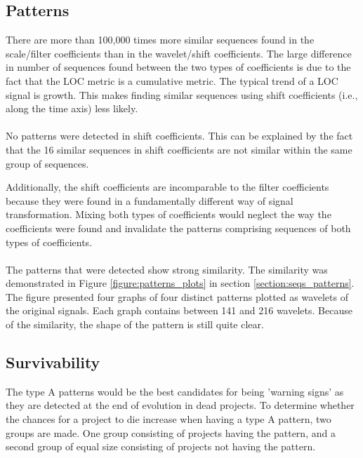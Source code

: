 \subsection{Patterns}
\label{section:pattern_evaluation}
There are more than 100,000 times more similar sequences found in the
scale/filter coefficients than in the wavelet/shift coefficients. The large
difference in number of sequences found between the two types of coefficients
is due to the fact that the LOC metric is a cumulative metric. The typical
trend of a LOC signal is growth. This makes finding similar sequences using
shift coefficients (i.e., along the time axis) less likely.

\paragraph{}
No patterns were detected in shift coefficients. This can be explained by the
fact that the 16 similar sequences in shift coefficients are not similar within
the same group of sequences.

Additionally, the shift coefficients are incomparable to the filter coefficients
because they were found in a fundamentally different way of signal
transformation. Mixing both types of coefficients would neglect the way the
coefficients were found and invalidate the patterns comprising sequences of
both types of coefficients.

\paragraph{}
The patterns that were detected show strong similarity. The similarity was
demonstrated in Figure \ref{figure:patterns_plots} in section
\ref{section:seqs_patterns}. The figure presented four graphs of four distinct
patterns plotted as wavelets of the original signals. Each graph contains
between 141 and 216 wavelets. Because of the similarity, the shape of the
pattern is still quite clear.

\subsection{Survivability}
\label{section:kp_survival}
The type A patterns would be the best candidates for being 'warning signs' as
they are detected at the end of evolution in dead projects. To determine whether
the chances for a project to die increase when having a type A pattern, two
groups are made. One group consisting of projects having the pattern, and
a second group of equal size consisting of projects not having the pattern.

